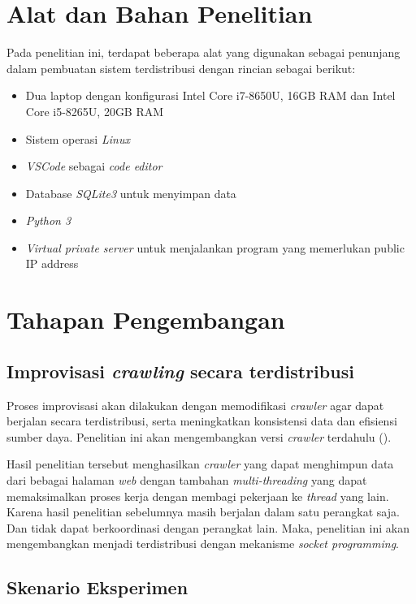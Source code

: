 \section{Alat dan Bahan Penelitian}

Pada penelitian ini, terdapat beberapa alat yang digunakan sebagai penunjang
dalam pembuatan sistem terdistribusi dengan rincian sebagai berikut:

\begin{itemize}
  \item{Dua laptop dengan konfigurasi Intel Core i7-8650U, 16GB RAM dan Intel Core i5-8265U, 20GB RAM}
  \item{Sistem operasi \textit{Linux}}
  \item{\textit{VSCode} sebagai \textit{code editor}}
  \item{Database \textit{SQLite3} untuk menyimpan data}
  \item{\textit{Python 3}}
  \item{\textit{Virtual private server} untuk menjalankan program yang memerlukan public IP address}
\end{itemize}

\section{Tahapan Pengembangan}

\subsection{Improvisasi \emph{crawling} secara terdistribusi}

Proses improvisasi akan dilakukan dengan memodifikasi \emph{crawler} agar dapat berjalan secara terdistribusi, serta meningkatkan konsistensi data dan efisiensi sumber daya. Penelitian ini akan mengembangkan versi \emph{crawler} terdahulu (\cite{lazuardy2023search}). 

Hasil penelitian tersebut menghasilkan \emph{crawler} yang dapat menghimpun data dari bebagai halaman \emph{web} dengan tambahan \emph{multi-threading} yang dapat memaksimalkan proses kerja dengan membagi pekerjaan ke \emph{thread} yang lain. Karena hasil penelitian sebelumnya masih berjalan dalam satu perangkat saja. Dan tidak dapat berkoordinasi dengan perangkat lain. Maka, penelitian ini akan mengembangkan menjadi terdistribusi dengan mekanisme \emph{socket programming}.

\subsection{Skenario Eksperimen}

